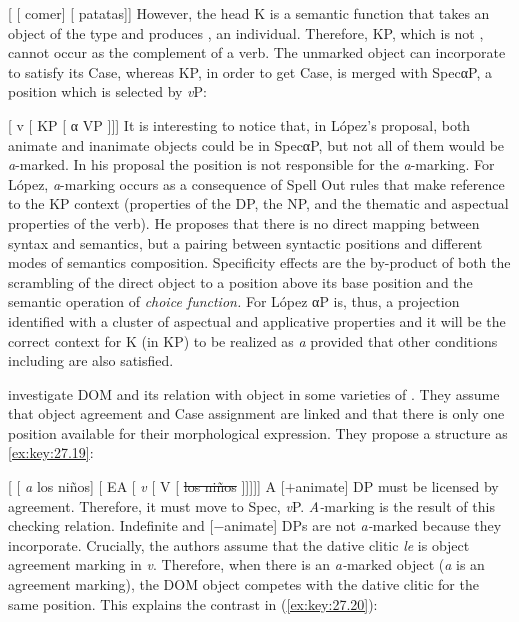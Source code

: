 \documentclass[output=paper]{langsci/langscibook}
\begin{document}
\ea\label{ex:key:27.17}
    [ [ comer] [ patatas]]
\z
However, the head K is a semantic function that takes an object of the type
 and produces , an individual. Therefore, KP, which is not ,
cannot occur as the complement of a verb. The unmarked object  can
incorporate to satisfy its Case, whereas KP, in order to get Case, is merged
with SpecαP, a position which is selected by \emph{v}P:

\ea\label{ex:key:27.18}
    {}[  v [  KP [  α  VP ]]]
\z
It is interesting to notice that, in López's proposal, both animate and
inanimate objects could be in SpecαP, but not all of them would be
\emph{a}{}-marked. In his proposal the position is not responsible for the
\emph{a}{}-marking. For López, \emph{a}{}-marking occurs as a consequence
of Spell Out rules that make reference to the KP context (properties of the DP,
the NP, and the thematic and aspectual properties of the verb). He proposes
that there is no direct mapping between syntax and semantics, but a pairing
between syntactic positions and different modes of semantics composition.
Specificity effects are the by-product of both the scrambling of the direct
object to a position above its base position and the semantic operation of
\emph{choice function.} For López αP is, thus, a projection
identified with a cluster of aspectual and applicative properties and it will
be the correct context for K (in KP) to be realized as \emph{a} provided that
other conditions including  are also satisfied.

\citet{OrmazabalRomero2013} investigate DOM and
its relation with object  in some varieties of . They assume that
object agreement and Case assignment are linked and that there is only one
position available for their morphological expression. They propose a structure
as \eqref{ex:key:27.19}:

\ea\label{ex:key:27.19}
    {}[ [ \emph{a} los niños]  [ \gls{EA}
    [ \emph{v} [  V  [ \sout{los niños} ]]]]]
\z
A [$+$animate] DP must be licensed by agreement. Therefore, it must move to
Spec, \emph{v}P. \emph{A-}marking is the result of this checking relation.
Indefinite and [$-$animate] DPs are not \emph{a-}marked because they
incorporate. Crucially, the authors assume that the dative clitic \emph{le} is
object agreement marking in \emph{v}. Therefore, when there is an
\emph{a-}marked object (\emph{a} is an agreement marking), the
DOM object competes with the dative clitic for
the same position. This explains the contrast in
(\ref{ex:key:27.20}):\largerpage[2]
\end{document}
